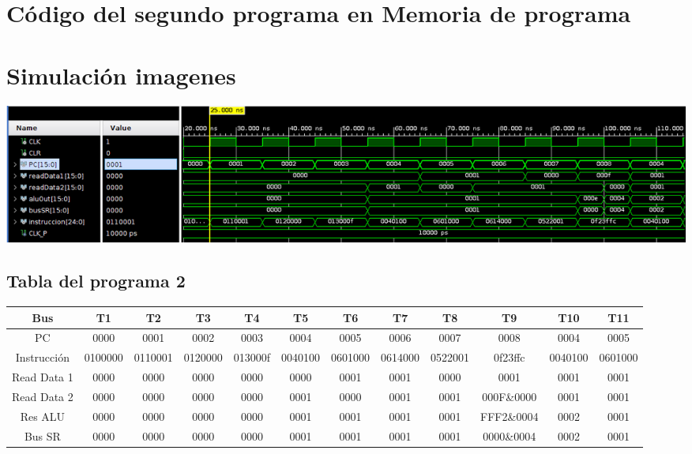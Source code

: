 \documentclass[8pt,executivepaper]{article}
\begin{document}
\section{Código del segundo programa en Memoria de programa}
\begin{center}
  
\end{center}
\section{Simulación imagenes}
\begin{center}
  \includegraphics[scale=0.35]{img/programa1-0.png}
\end{center}
\begin{landscape}
  \section{Tabla del programa 2}
  \begin{tabular}{|c|c|c|c|c|c|c|c|c|c|c|c|}
    \hline
    Bus & T1 & T2 & T3 & T4 & T5 & T6 & T7 & T8 & T9 & T10 & T11\\
    \hline
    PC & 0000 & 0001 & 0002 & 0003 & 0004 & 0005 & 0006 & 0007 & 0008 & 0004 & 0005 \\
    \hline
    Instrucción & 0100000 & 0110001 & 0120000 & 013000f & 0040100 & 0601000 & 0614000 & 0522001 & 0f23ffc & 0040100 & 0601000 \\
    \hline
    Read Data 1 & 0000 & 0000 & 0000 & 0000 & 0000 & 0001 & 0001 & 0000 & 0001 & 0001 & 0001\\
    \hline
    Read Data 2 & 0000 & 0000 & 0000 & 0000 & 0001 & 0000 & 0001 & 0001 & 000F\&0000 & 0001 & 0001\\
    \hline
    Res ALU & 0000 & 0000 & 0000 & 0000 & 0001 & 0001 & 0001 & 0001 & FFF2\&0004 & 0002 & 0001 \\
    \hline
    Bus SR & 0000 & 0000 & 0000 & 0000 & 0001 & 0001 & 0001 & 0001 & 0000\&0004 & 0002 & 0001 \\
    \hline
  \end{tabular}
\end{landscape}
\end{document}
